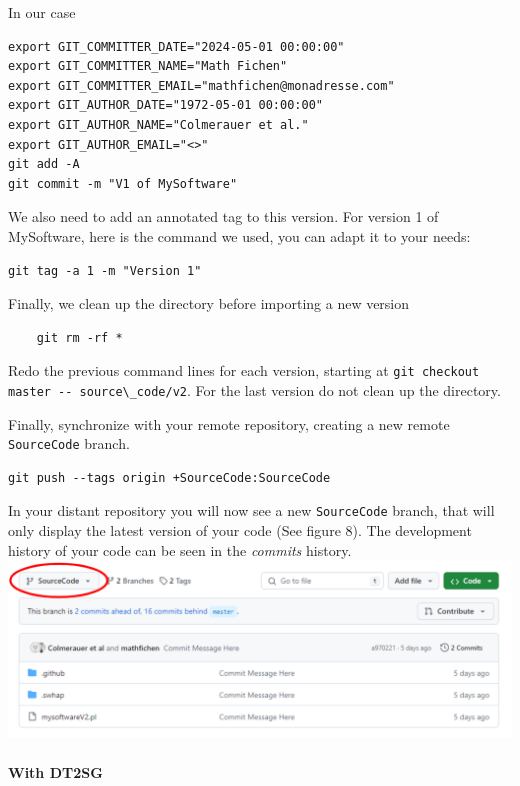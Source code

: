 \documentclass[]{article}
\newcommand{\passthrough}[1]{#1}
\begin{document}
In our case

\begin{lstlisting}
export GIT_COMMITTER_DATE="2024-05-01 00:00:00"
export GIT_COMMITTER_NAME="Math Fichen"
export GIT_COMMITTER_EMAIL="mathfichen@monadresse.com"
export GIT_AUTHOR_DATE="1972-05-01 00:00:00"
export GIT_AUTHOR_NAME="Colmerauer et al."
export GIT_AUTHOR_EMAIL="<>"
git add -A
git commit -m "V1 of MySoftware"
\end{lstlisting}

We also need to add an annotated tag to this version. For version 1 of
MySoftware, here is the command we used, you can adapt it to your needs:

\begin{lstlisting}
git tag -a 1 -m "Version 1"
\end{lstlisting}

Finally, we clean up the directory before importing a new version

\begin{lstlisting}
    git rm -rf *
\end{lstlisting}

Redo the previous command lines for each version, starting at
\passthrough{\lstinline!git checkout master -- source\_code/v2!}. For
the last version do not clean up the directory.

Finally, synchronize with your remote repository, creating a new remote
\passthrough{\lstinline!SourceCode!} branch.

\begin{lstlisting}
git push --tags origin +SourceCode:SourceCode
\end{lstlisting}

In your distant repository you will now see a new
\passthrough{\lstinline!SourceCode!} branch, that will only display the
latest version of your code (See figure 8). The development history of
your code can be seen in the \emph{commits} history.
\includegraphics{./media2/15_SourceCodeBranch2.png}

\hypertarget{with-dt2sg}{%
\paragraph{With DT2SG}\label{with-dt2sg}}
\end{document}
